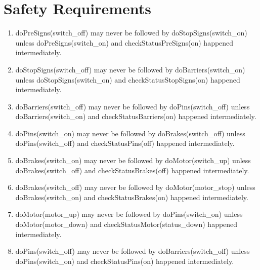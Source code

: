\section{Safety Requirements}
\begin{enumerate}


	\item doPreSigns(switch\_off) may never be followed by doStopSigns(switch\_on) unless doPreSigns(switch\_on) and checkStatusPreSigns(on) happened intermediately.
	
	
	
	\item doStopSigns(switch\_off) may never be followed by doBarriers(switch\_on) unless doStopSigns(switch\_on) and checkStatusStopSigns(on) happened intermediately.
	
	
	
	\item doBarriers(switch\_off) may never be followed by doPins(switch\_off) unless doBarriers(switch\_on) and checkStatusBarriers(on) happened intermediately. 
	
	
	
	\item doPins(switch\_on) may never be followed by doBrakes(switch\_off) unless doPins(switch\_off) and checkStatusPins(off) happened intermediately. 
	
	
	\item doBrakes(switch\_on) may never be followed by doMotor(switch\_up) unless doBrakes(switch\_off) and checkStatusBrakes(off) happened intermediately. 
	
	
	
	\item doBrakes(switch\_off) may never be followed by doMotor(motor\_stop) unless doBrakes(switch\_on) and checkStatusBrakes(on) happened intermediately. 
	
		

	\item doMotor(motor\_up) may never be followed by doPins(switch\_on) unless doMotor(motor\_down) and checkStatusMotor(status\_down) happened intermediately. 
	
	
	
	\item doPins(switch\_off) may never be followed by doBarriers(switch\_off) unless doPins(switch\_on) and checkStatusPins(on) happened intermediately. 
	
	

\end{enumerate}
